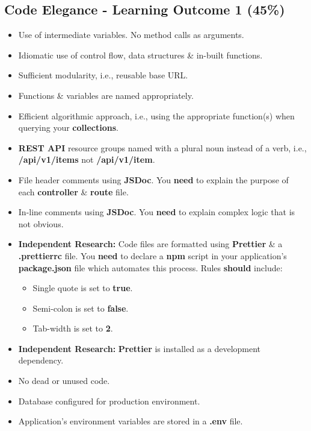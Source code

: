 \documentclass{article}
\begin{document}
\subsection*{Code Elegance - Learning Outcome 1 (45\%)}
\begin{itemize}
	\item Use of intermediate variables. No method calls as arguments.
	\item Idiomatic use of control flow, data structures \& in-built functions.
	\item Sufficient modularity, i.e., reusable base URL.
	\item Functions \& variables are named appropriately.
	\item Efficient algorithmic approach, i.e., using the appropriate function(s) when querying your \textbf{collections}.
	\item \textbf{REST API} resource groups named with a plural noun instead of a verb, i.e., \textbf{/api/v1/items} not \textbf{/api/v1/item}.
	\item File header comments using \textbf{JSDoc}. You \textbf{need} to explain the purpose of each \textbf{controller} \& \textbf{route} file.
	\item In-line comments using \textbf{JSDoc}. You \textbf{need} to explain complex logic that is not obvious.
	\item \textbf{Independent Research:} Code files are formatted using \textbf{Prettier} \& a \textbf{.prettierrc} file. You \textbf{need} to declare a \textbf{npm} script in your application's \textbf{package.json} file which automates this process. Rules \textbf{should} include:
	      \begin{itemize}
		      \item Single quote is set to \textbf{true}.
		      \item Semi-colon is set to \textbf{false}.
		      \item Tab-width is set to \textbf{2}.
	      \end{itemize}
	\item \textbf{Independent Research:} \textbf{Prettier} is installed as a development dependency.
	\item No dead or unused code.
	\item Database configured for production environment.
	\item Application's environment variables are stored in a \textbf{.env} file.
\end{itemize}
\end{document}
